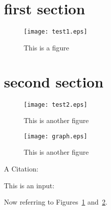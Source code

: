 \documentclass[
    letterpaper %
]{article}
\begin{document}
\tableofcontents
\listoffigures

\section{first section}

\nocite{testentry3}

\begin{figure}
\centering
    \texttt{[image: test1.eps]}
\caption{This is a figure}
\label{fig:test1}
\end{figure}

\section{second section}

\begin{figure}
\centering
    \texttt{[image: test2.eps]}
\caption{This is another figure}
\label{fig:test2}
\end{figure}

\begin{figure}
\centering
    \texttt{[image: graph.eps]}
\caption{This is another figure}
\label{fig:test3}
\end{figure}

A Citation: \cite{testentry}

This is an input: {}




Now referring to Figures~\ref{fig:test1} and~\ref{fig:test2}.
\end{document}
